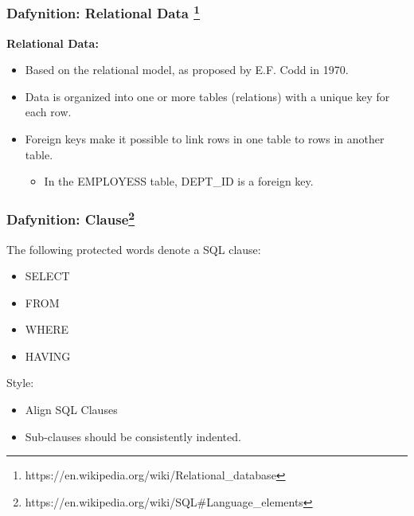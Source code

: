 \documentclass{beamer}
\begin{document}
\begin{frame} %
  \frametitle{Dafynition: Relational Data \footnote{https://en.wikipedia.org/wiki/Relational\_database}}

  \textbf{Relational Data:}
  \begin{itemize}
  \item Based on the relational model, as proposed by E.F. Codd in
    1970.
  \item Data is organized into one or more tables (relations) with a
    unique key for each row.
  \item Foreign keys make it possible to link rows in one table to
    rows in another table.
    \begin{itemize}
    \item In the EMPLOYESS table, DEPT\_ID is a foreign key.
    \end{itemize}
  \end{itemize}

\end{frame}  

\begin{frame} %
  \frametitle{Dafynition: Clause\footnote{https://en.wikipedia.org/wiki/SQL\#Language\_elements}}
  
  The following protected words denote a SQL clause:

  \smallskip
  \begin{itemize}
  \item SELECT
  \item FROM
  \item WHERE
  \item HAVING
  \end{itemize}
  
  \bigskip
  \pause
  Style:
  \begin{itemize}
  \item Align SQL Clauses
  \item Sub-clauses should be consistently indented.
  \end{itemize}
  
\end{frame}  
\end{document}
